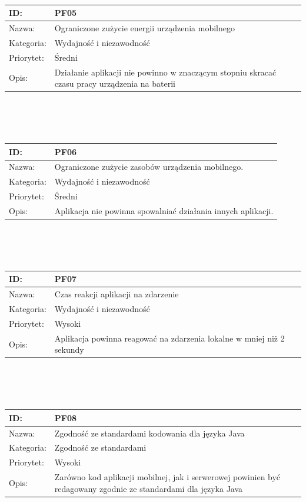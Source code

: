 \documentclass[11pt,a4paper,polish,thesis]{dcsbook}
\begin{document}
\begin{tabular}{|p{2cm}|p{12cm}|}
\\ \hline \end{tabular} \\\\\ \begin{tabular}{|p{2cm}|p{12cm}|}  \hline ID: &
PF05
\\ \hline Nazwa: &
Ograniczone zużycie energii urządzenia mobilnego
\\ \hline Kategoria: &
Wydajność i niezawodność
\\ \hline Priorytet: &
Średni
\\ \hline Opis: &
Działanie aplikacji nie powinno w znaczącym stopniu skracać czasu pracy urządzenia na baterii

\\ \hline \end{tabular} \\\\\ \begin{tabular}{|p{2cm}|p{12cm}|}  \hline ID: &
PF06
\\ \hline Nazwa: &
Ograniczone zużycie zasobów urządzenia mobilnego.
\\ \hline Kategoria: &
Wydajność i niezawodność
\\ \hline Priorytet: &
Średni
\\ \hline Opis: &
Aplikacja nie powinna spowalniać działania innych aplikacji.

\\ \hline \end{tabular} \\\\\ \begin{tabular}{|p{2cm}|p{12cm}|}  \hline ID: &
PF07
\\ \hline Nazwa: &
Czas reakcji aplikacji na zdarzenie
\\ \hline Kategoria: &
Wydajność i niezawodność
\\ \hline Priorytet: &
Wysoki
\\ \hline Opis: &
Aplikacja powinna reagować na zdarzenia lokalne w mniej niż 2 sekundy

\\ \hline \end{tabular} \\\\\ \begin{tabular}{|p{2cm}|p{12cm}|}  \hline ID: &
PF08
\\ \hline Nazwa: &
Zgodność ze standardami kodowania dla języka Java
\\ \hline Kategoria: &
Zgodność ze standardami
\\ \hline Priorytet: &
Wysoki
\\ \hline Opis: &
Zarówno kod aplikacji mobilnej, jak i serwerowej powinien być redagowany zgodnie ze standardami dla języka Java


\end{tabular}
\end{document}
